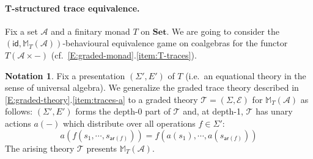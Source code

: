 \documentclass[sigconf,
			final%
			nonacm
                        ]{acmart}
\numberwithin{equation}{section}
\numberwithin{equation}{section}
\theoremstyle{plain}
\theoremstyle{definition}
\newtheorem{expl}[thm]{Example}
\newtheorem{notn}[thm]{Notation}
\newcommand{\id}{\mathsf{id}}
\newcommand{\M}{\mathbb{M}}                   %
\newcommand{\T}{\mathcal{T}}                     %
\newcommand{\arity}{\mathsf{ar}}
\newcommand{\Set}{\mathbf{Set}}
\newcommand{\A}{\mathcal{A}}            %
\newcommand{\CalG}{\mathcal{G}}             %
\newcommand{\E}{\mathcal{E}}   %
\newcommand{\dl}{\mathbf 0}
\newcommand{\pow}{\mathscr P}              %
\newcommand{\powf}{\pow_{\mathsf f}}
\begin{document}

\paragraph*{T-structured trace equivalence.}
Fix a set $\A$ and a finitary monad $T$ on $\Set$. We are going to
consider the $(\id, \M_T(\A))$-behavioural equivalence game on
coalgebras for the functor $T(\A\times -)$
(cf.~\cref{E:graded-monad}.\ref{item:T-traces}).

\begin{notn}
  Fix a presentation $(\Sigma', E')$ of $T$ (i.e.~an equational theory
  in the sense of universal algebra).  We generalize the graded trace
  theory described in \cref{E:graded-theory}.\ref{item:traces-a} to
  a graded theory $\T=(\Sigma,\E)$ for $\M_T(\A)$ as follows:
  $(\Sigma', E')$ forms the depth-0 part of $\T$ and, at depth-1, $\T$
  has unary actions $a(-)$ which distribute over all operations
  $f\in \Sigma'$:
\[
a(f(s_1,\cdots,s_{\arity(f)}))= f(a (s_1),\cdots,a(s_{\arity(f)}))
\]
The arising theory $\T$ presents $\M_T(\A)$.
\end{notn}
\end{document}
